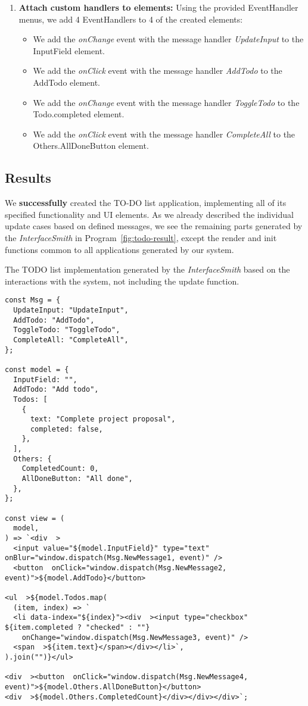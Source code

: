 \begin{enumerate}
\begin{itemize}
\end{itemize}

\item \textbf{Attach custom handlers to elements:} Using the provided EventHandler menus, we add 4 EventHandlers to 4 of the created elements:
\begin{itemize}
	\item We add the \emph{onChange} event with the message handler \emph{UpdateInput} to the InputField element.
	\item We add the \emph{onClick} event with the message handler \emph{AddTodo} to the AddTodo element.
	\item We add the \emph{onChange} event with the message handler \emph{ToggleTodo} to the Todo.completed element.
	\item We add the \emph{onClick} event with the message handler \emph{CompleteAll} to the Others.AllDoneButton element.
\end{itemize}
\end{enumerate}
\medskip
\subsection{Results}
We \textbf{successfully} created the TO-DO list application, implementing all of its specified functionality and UI elements.
As we already described the individual update cases based on defined messages, we see the remaining parts generated by the \emph{InterfaceSmith} in Program~\ref{fig:todo-result},
except the render and init functions common to all applications generated by our system.

\begin{listing}[p]
	\caption {The TODO list implementation generated by the \emph{InterfaceSmith} based on the interactions with the system, not including the update function.}
	\label{fig:todo-result}
	\begin{lstlisting}
const Msg = {
  UpdateInput: "UpdateInput",
  AddTodo: "AddTodo",
  ToggleTodo: "ToggleTodo",
  CompleteAll: "CompleteAll",
};

const model = {
  InputField: "",
  AddTodo: "Add todo",
  Todos: [
    {
      text: "Complete project proposal",
      completed: false,
    },
  ],
  Others: {
    CompletedCount: 0,
    AllDoneButton: "All done",
  },
};

const view = (
  model,
) => `<div  >
  <input value="${model.InputField}" type="text" onBlur="window.dispatch(Msg.NewMessage1, event)" />
  <button  onClick="window.dispatch(Msg.NewMessage2, event)">${model.AddTodo}</button>

<ul  >${model.Todos.map(
  (item, index) => `
  <li data-index="${index}"><div  ><input type="checkbox" ${item.completed ? "checked" : ""} 
    onChange="window.dispatch(Msg.NewMessage3, event)" />
  <span  >${item.text}</span></div></li>`,
).join("")}</ul>

<div  ><button  onClick="window.dispatch(Msg.NewMessage4, event)">${model.Others.AllDoneButton}</button>
<div  >${model.Others.CompletedCount}</div></div></div>`;
\end{lstlisting}
\end{listing}

